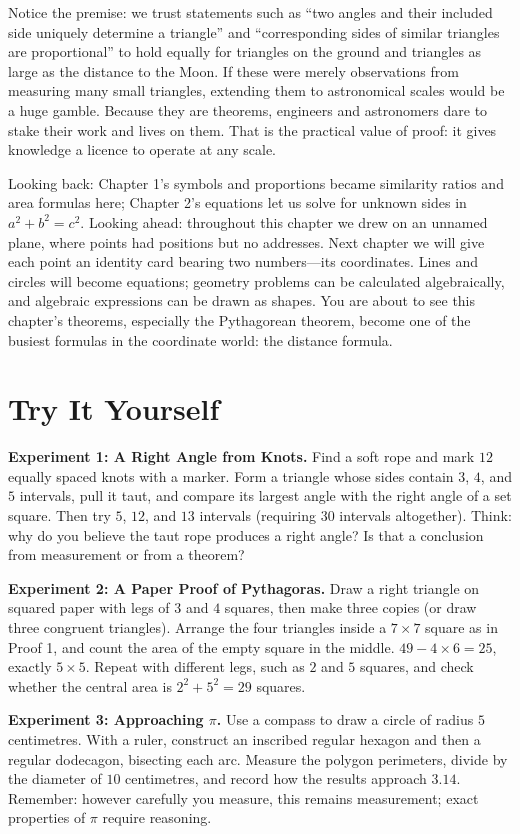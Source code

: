 Notice the premise: we trust statements such as ``two angles and their included side uniquely determine a triangle'' and ``corresponding sides of similar triangles are proportional'' to hold equally for triangles on the ground and triangles as large as the distance to the Moon. If these were merely observations from measuring many small triangles, extending them to astronomical scales would be a huge gamble. Because they are theorems, engineers and astronomers dare to stake their work and lives on them. That is the practical value of proof: it gives knowledge a licence to operate at any scale.

\begin{lianjie}
Looking back: Chapter 1's symbols and proportions became similarity ratios and area formulas here; Chapter 2's equations let us solve for unknown sides in $a^2+b^2=c^2$. Looking ahead: throughout this chapter we drew on an unnamed plane, where points had positions but no addresses. Next chapter we will give each point an identity card bearing two numbers---its coordinates. Lines and circles will become equations; geometry problems can be calculated algebraically, and algebraic expressions can be drawn as shapes. You are about to see this chapter's theorems, especially the Pythagorean theorem, become one of the busiest formulas in the coordinate world: the distance formula.
\end{lianjie}

\section{Try It Yourself}

\begin{shiyan}
\textbf{Experiment 1: A Right Angle from Knots.} Find a soft rope and mark $12$ equally spaced knots with a marker. Form a triangle whose sides contain $3$, $4$, and $5$ intervals, pull it taut, and compare its largest angle with the right angle of a set square. Then try $5$, $12$, and $13$ intervals (requiring $30$ intervals altogether). Think: why do you believe the taut rope produces a right angle? Is that a conclusion from measurement or from a theorem?

\textbf{Experiment 2: A Paper Proof of Pythagoras.} Draw a right triangle on squared paper with legs of $3$ and $4$ squares, then make three copies (or draw three congruent triangles). Arrange the four triangles inside a $7\times7$ square as in Proof 1, and count the area of the empty square in the middle. $49-4\times6=25$, exactly $5\times5$. Repeat with different legs, such as $2$ and $5$ squares, and check whether the central area is $2^2+5^2=29$ squares.

\textbf{Experiment 3: Approaching $\pi$.} Use a compass to draw a circle of radius $5$ centimetres. With a ruler, construct an inscribed regular hexagon and then a regular dodecagon, bisecting each arc. Measure the polygon perimeters, divide by the diameter of $10$ centimetres, and record how the results approach $3.14$. Remember: however carefully you measure, this remains measurement; exact properties of $\pi$ require reasoning.
\end{shiyan}

